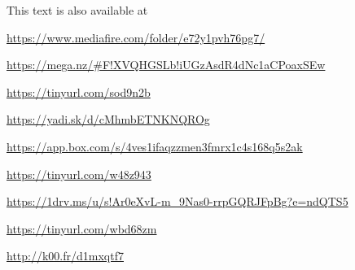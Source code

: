 \documentclass[parskip=half,fontsize=12pt]{scrartcl}%
\begin{document}
This text is also available at 

\href{https://www.mediafire.com/folder/e72y1pvh76pg7/}{https://www.mediafire.com/folder/e72y1pvh76pg7/}

\href{https://mega.nz/#F!XVQHGSLb!iUGzAsdR4dNc1aCPoaxSEw}{https://mega.nz/\#F!XVQHGSLb!iUGzAsdR4dNc1aCPoaxSEw}

\href{https://tinyurl.com/sod9n2b}{https://tinyurl.com/sod9n2b}

\href{https://yadi.sk/d/cMhmbETNKNQROg}{https://yadi.sk/d/cMhmbETNKNQROg}

\href{https://app.box.com/s/4ves1ifaqzzmen3fmrx1c4s168q5s2ak}{https://app.box.com/s/4ves1ifaqzzmen3fmrx1c4s168q5s2ak}

\href{https://tinyurl.com/w48z943}{https://tinyurl.com/w48z943}

\href{https://1drv.ms/u/s!Ar0eXvL-m_9Nas0-rrpGQRJFpBg?e=ndQTS5}{https://1drv.ms/u/s!Ar0eXvL-m\_9Nas0-rrpGQRJFpBg?e=ndQTS5}

\href{https://tinyurl.com/wbd68zm}{https://tinyurl.com/wbd68zm}

\href{http://k00.fr/d1mxqtf7}{http://k00.fr/d1mxqtf7}
\end{document}
